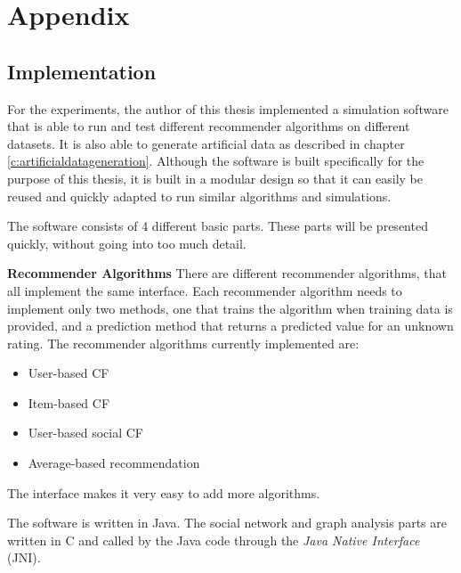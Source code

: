\chapter{Appendix}
\label{a:appendix}

\section{Implementation}
\label{st:implementation} For the experiments, the author of this thesis implemented a simulation software that is able to run and test different recommender algorithms on different datasets. It is also able to generate artificial data as described in chapter \ref{c:artificialdatageneration}. Although the software is built specifically for the purpose of this thesis, it is built in a modular design so that it can easily be reused and quickly adapted to run similar algorithms and simulations.
\newline

The software consists of 4 different basic parts. These parts will be presented quickly, without going into too much detail.
\newline

\textbf{Recommender Algorithms} There are different recommender algorithms, that all implement the same interface. Each recommender algorithm needs to implement only two methods, one that trains the algorithm when training data is provided, and a prediction method that returns a predicted value for an unknown rating. The recommender algorithms currently implemented are:

\begin{itemize}
\item User-based CF
\item Item-based CF
\item User-based social CF
\item Average-based recommendation
\end{itemize}

The interface makes it very easy to add more algorithms.
\newline
\newline

The software is written in Java. The social network and graph analysis parts are written in C and called by the Java code through the \textit{Java Native Interface} (JNI).